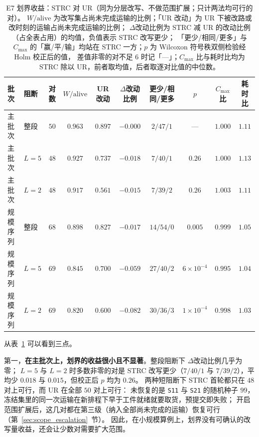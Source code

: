 \documentclass[manuscript,screen,review]{acmart}
\providecommand{\STRC}{\textsc{STRC}}
\begin{document}
\begin{table}[t]
\centering
\caption{E7 划界收益：\STRC{} 对 UR（同为分层改写、不做范围扩展；只计两法均可行的对）。
\(W/\mathrm{alive}\) 为改写集占尚未完成运输的比例；「UR 改动」为 UR 下被改路或改时刻的运输占尚未完成运输的比例；
\(\Delta\)改动比例为 \STRC{} 减 UR 的改动比例（占全表占用）的均值，负值表示 \STRC{} 改写更少；
「更少/相同/更多」与 \(C_{\max}\) 的「赢/平/输」均站在 \STRC{} 一方；\(p\) 为 Wilcoxon 符号秩双侧检验经 Holm 校正后的值，
差值非零的对不足 \(6\) 时记「---」；\(C_{\max}\) 比与耗时比均为 \STRC{} 除以 UR，前者取均值，后者取逐对比值的中位数。}
\label{tab:boundary}
\small
\setlength{\tabcolsep}{3pt}
\begin{tabular}{@{}llcccccccc@{}}
\toprule
批次 & 阻断 & 对数 & \(W/\mathrm{alive}\) & UR 改动 & \(\Delta\)改动比例 & 更少/相同/更多 & \(p\) & \(C_{\max}\) 比 & 耗时比 \\
\midrule
主批次 & 整段 & \(50\) & \(0.963\) & \(0.897\) & \(-0.000\) & \(2/47/1\) & --- & \(1.000\) & \(1.11\) \\
主批次 & \(L=5\) & \(48\) & \(0.927\) & \(0.737\) & \(-0.018\) & \(7/40/1\) & \(0.26\) & \(1.000\) & \(1.13\) \\
主批次 & \(L=2\) & \(48\) & \(0.917\) & \(0.561\) & \(-0.015\) & \(7/39/2\) & \(0.26\) & \(1.003\) & \(1.11\) \\
\addlinespace[2pt]
规模序列 & 整段 & \(68\) & \(0.898\) & \(0.827\) & \(-0.017\) & \(14/54/0\) & \(0.005\) & \(0.999\) & \(1.05\) \\
规模序列 & \(L=5\) & \(69\) & \(0.845\) & \(0.700\) & \(-0.059\) & \(27/40/2\) & \(6\times10^{-4}\) & \(0.995\) & \(1.04\) \\
规模序列 & \(L=2\) & \(69\) & \(0.820\) & \(0.600\) & \(-0.082\) & \(30/36/3\) & \(1\times10^{-4}\) & \(0.998\) & \(1.03\) \\
\bottomrule
\end{tabular}
\end{table}

从表~\ref{tab:boundary} 可以看到三点。

第一，\textbf{在主批次上，划界的收益很小且不显著}。整段阻断下 \(\Delta\)改动比例几乎为零；
\(L=5\) 与 \(L=2\) 时多数非零的对是 \STRC{} 改写更少（\(7/40/1\) 与 \(7/39/2\)），平均少 \(0.018\) 与 \(0.015\)，但校正后 \(p\) 均为 \(0.26\)。
两种短阻断下 \STRC{} 首轮都只在 \(48\) 对上可行，而 UR 在全部 \(50\) 对上可行：
未恢复的是 \texttt{S11} 与 \texttt{S21} 的随机种子 \(99\)，冻结集里的同一次运输在新排程下早于工件就绪就要取货，预提交即失败；
开启范围扩展后，这几对都在第三级（纳入全部尚未完成的运输）恢复可行（第~\ref{sec:scope_escalation}~节）。
因此，在小规模算例上，划界没有可确认的改写量收益，还会让少数对需要扩大范围。
\end{document}
